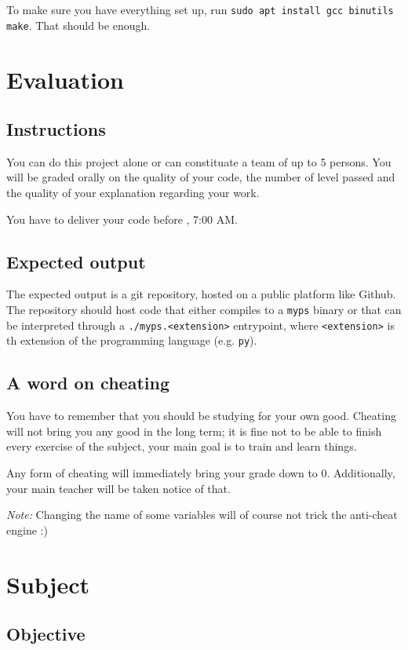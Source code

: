 \documentclass[12pt]{article}
\begin{document}
To make sure you have everything set up, run \texttt{sudo apt install gcc binutils make}. That should be enough.

\section{Evaluation}
\subsection{Instructions}

You can do this project alone or can constituate a team of up to 5 persons. You will be graded orally on the quality of your code, the number of level passed  and the quality of your explanation regarding your work.

You have to deliver your code before , 7:00 AM.

\subsection{Expected output}

The expected output is a git repository, hosted on a public platform like Github. The repository should host code that either compiles to a \texttt{myps} binary or that can be interpreted through a \texttt{./myps.<extension>} entrypoint, where \texttt{<extension>} is th extension of the programming language (e.g. \texttt{py}).

\subsection{A word on cheating}

You have to remember that you should be studying for your own good. Cheating will not bring you any good in the long term; it is fine not to be able to finish every exercise of the subject, your main goal is to train and learn things.

Any form of cheating will immediately bring your grade down to 0. Additionally, your main teacher will be taken notice of that.

\textit{Note:} Changing the name of some variables will of course not trick the anti-cheat engine :)

\section{Subject}

\subsection{Objective}
\end{document}
